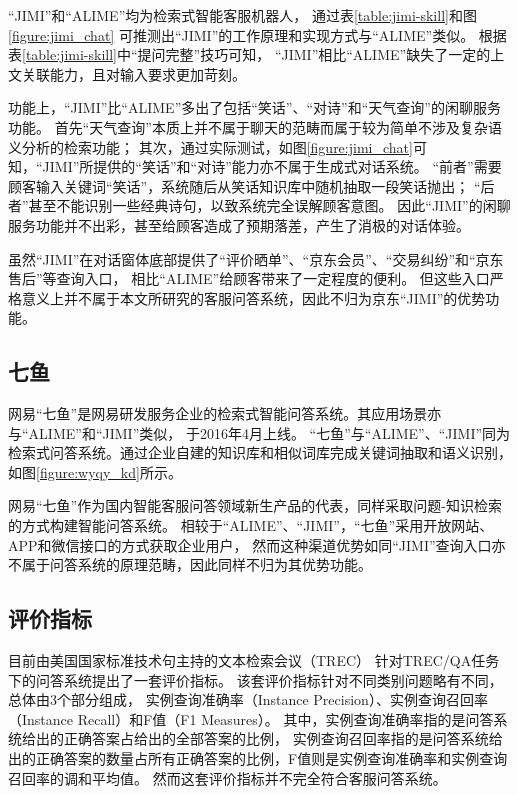 “JIMI”和“ALIME”均为检索式智能客服机器人，
通过表\ref{table:jimi-skill}和图\ref{figure:jimi_chat}
可推测出“JIMI”的工作原理和实现方式与“ALIME”类似。
根据表\ref{table:jimi-skill}中“提问完整”技巧可知，
“JIMI”相比“ALIME”缺失了一定的上文关联能力，且对输入要求更加苛刻。

功能上，“JIMI”比“ALIME”多出了包括“笑话”、“对诗”和“天气查询”的闲聊服务功能。
首先“天气查询”本质上并不属于聊天的范畴而属于较为简单不涉及复杂语义分析的检索功能；
其次，通过实际测试，如图\ref{figure:jimi_chat}可知，“JIMI”所提供的“笑话”和“对诗”能力亦不属于生成式对话系统。
“前者”需要顾客输入关键词“笑话”，系统随后从笑话知识库中随机抽取一段笑话抛出；
“后者”甚至不能识别一些经典诗句，以致系统完全误解顾客意图。
因此“JIMI”的闲聊服务功能并不出彩，甚至给顾客造成了预期落差，产生了消极的对话体验。

虽然“JIMI”在对话窗体底部提供了“评价晒单”、“京东会员”、“交易纠纷”和“京东售后”等查询入口，
相比“ALIME”给顾客带来了一定程度的便利。
但这些入口严格意义上并不属于本文所研究的客服问答系统，因此不归为京东“JIMI”的优势功能。

\subsection{七鱼}
\label{subsection:qiyu}

网易“七鱼”是网易研发服务企业的检索式智能问答系统。其应用场景亦与“ALIME”和“JIMI”类似，
于2016年4月上线。
“七鱼”与“ALIME”、“JIMI”同为检索式问答系统。通过企业自建的知识库和相似词库完成关键词抽取和语义识别，
如图\ref{figure:wyqy_kd}所示。


网易“七鱼”作为国内智能客服问答领域新生产品的代表，同样采取问题-知识检索的方式构建智能问答系统。
相较于“ALIME”、“JIMI”，“七鱼”采用开放网站、APP和微信接口的方式获取企业用户，
然而这种渠道优势如同“JIMI”查询入口亦不属于问答系统的原理范畴，因此同样不归为其优势功能。

\subsection{评价指标}
\label{subsection:evaluation}

目前由美国国家标准技术句主持的文本检索会议（TREC）
针对TREC/QA任务下的问答系统提出了一套评价指标\citep{voorhees2000building}。
该套评价指标针对不同类别问题略有不同，总体由3个部分组成，
实例查询准确率（Instance Precision）、实例查询召回率（Instance Recall）和F值（F1 Measures）。
其中，实例查询准确率指的是问答系统给出的正确答案占给出的全部答案的比例，
实例查询召回率指的是问答系统给出的正确答案的数量占所有正确答案的比例，F值则是实例查询准确率和实例查询召回率的调和平均值。
然而这套评价指标并不完全符合客服问答系统。

